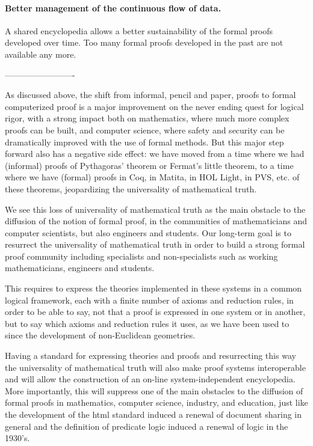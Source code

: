 \paragraph{Better management of the continuous flow of data.}
A shared encyclopedia allows a better sustainability of the formal
proofs developed over time. Too many formal proofs developed in the
past are not available any more.



-------------------------

As discussed above, the shift from informal, pencil and paper, proofs
to formal computerized proof is a major improvement on the never
ending quest for logical rigor, with a strong impact both on
mathematics, where much more complex proofs can be built, and computer
science, where safety and security can be dramatically improved with
the use of formal methods. But this major step forward also has a
negative side effect: we have moved from a time where we had
(informal) proofs of Pythagoras' theorem or Fermat's little theorem,
to a time where we have (formal) proofs in Coq, in Matita, in HOL
Light, in PVS, etc. of these theorems, jeopardizing the universality
of mathematical truth.

We see this loss of universality of mathematical truth as the main
obstacle to the diffusion of the notion of formal proof, in the
communities of mathematicians and computer scientists, but also
engineers and students. Our long-term goal is to resurrect the
universality of mathematical truth in order to build a strong formal
proof community including specialists and non-specialists such as
working mathematicians, engineers and students.

This requires to express the theories implemented in these systems in
a common logical framework, each with a finite number of axioms and
reduction rules, in order to be able to say, not that a proof is
expressed in one system or in another, but to say which axioms and
reduction rules it uses, as we have been used to since the development
of non-Euclidean geometries.

Having a standard for expressing theories and proofs and resurrecting
this way the universality of mathematical truth will also make proof
systems interoperable and will allow the construction of an on-line
system-independent encyclopedia. More importantly, this will suppress
one of the main obstacles to the diffusion of formal proofs in
mathematics, computer science, industry, and education, just like the
development of the html standard induced a renewal of document sharing
in general and the definition of predicate logic induced a renewal of
logic in the 1930's.

